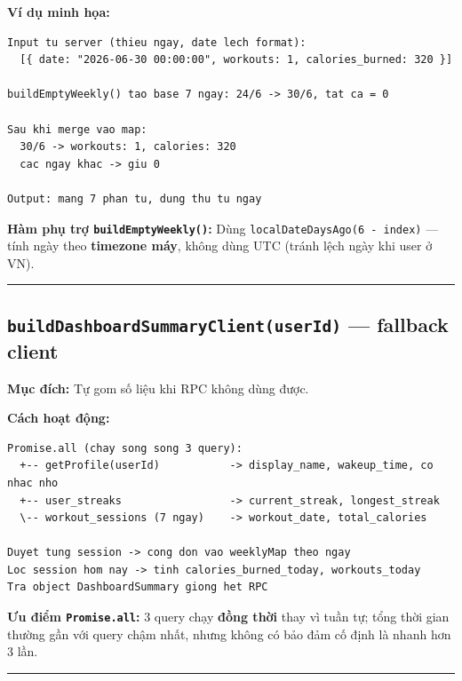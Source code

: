 \documentclass[12pt,a4paper]{article}
\begin{document}
\textbf{Ví dụ minh họa:}

\begin{verbatim}
Input tu server (thieu ngay, date lech format):
  [{ date: "2026-06-30 00:00:00", workouts: 1, calories_burned: 320 }]

buildEmptyWeekly() tao base 7 ngay: 24/6 -> 30/6, tat ca = 0

Sau khi merge vao map:
  30/6 -> workouts: 1, calories: 320
  cac ngay khac -> giu 0

Output: mang 7 phan tu, dung thu tu ngay
\end{verbatim}

\textbf{Hàm phụ trợ \texttt{buildEmptyWeekly()}:} Dùng
\texttt{localDateDaysAgo(6\ -\ index)} --- tính ngày theo
\textbf{timezone máy}, không dùng UTC (tránh lệch ngày khi user ở VN).

\begin{center}\rule{0.5\linewidth}{0.5pt}\end{center}

\subsection{\texorpdfstring{\texttt{buildDashboardSummaryClient(userId)}
--- fallback
client}{buildDashboardSummaryClient(userId) --- fallback client}}\label{builddashboardsummaryclientuserid-fallback-client}

\textbf{Mục đích:} Tự gom số liệu khi RPC không dùng được.

\textbf{Cách hoạt động:}

\begin{verbatim}
Promise.all (chay song song 3 query):
  +-- getProfile(userId)           -> display_name, wakeup_time, co nhac nho
  +-- user_streaks                 -> current_streak, longest_streak
  \-- workout_sessions (7 ngay)    -> workout_date, total_calories

Duyet tung session -> cong don vao weeklyMap theo ngay
Loc session hom nay -> tinh calories_burned_today, workouts_today
Tra object DashboardSummary giong het RPC
\end{verbatim}

\textbf{Ưu điểm \texttt{Promise.all}:} 3 query chạy \textbf{đồng thời}
thay vì tuần tự; tổng thời gian thường gần với query chậm nhất, nhưng
không có bảo đảm cố định là nhanh hơn 3 lần.

\begin{center}\rule{0.5\linewidth}{0.5pt}\end{center}
\end{document}

